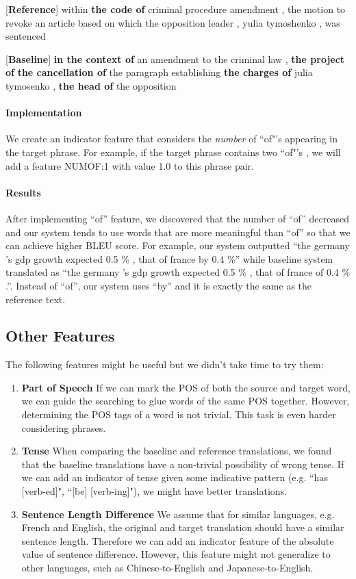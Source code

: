 \documentclass{article}
\begin{document}
[\textbf{Reference}] within \textbf{the code of} criminal procedure amendment , the motion to revoke an article based on which the opposition leader , yulia tymoshenko , was sentenced

[\textbf{Baseline}] \textbf{in the context of} an amendment to the criminal law , \textbf{the project of} \textbf{the cancellation of} the paragraph establishing \textbf{the charges of} julia tymosenko , \textbf{the head of} the opposition

\paragraph{Implementation} We create an indicator feature that considers the \textit{number} of ``of"'s appearing in the target phrase. For example, if the target phrase contains two ``of"'s , we will add a feature \textsc{NUMOF:1} with value 1.0 to this phrase pair.

\paragraph{Results} After implementing ``of'' feature, we discovered that the number of ``of'' decreased and our system tends to use words that are more meaningful than ``of'' so that we can achieve higher BLEU score. For example, our system outputted ``the germany 's gdp growth expected 0.5 \% , that of france by 0.4 \%'' while baseline system translated as ``the germany 's gdp growth expected 0.5 \% , that of france of 0.4 \% .''. Instead of ``of'', our system uses ``by'' and it is exactly the same as the reference text.

\subsection{Other Features}

The following features might be useful but we didn't take time to try them:

\begin{enumerate}
\item \textbf{Part of Speech} If we can mark the POS of both the source and target word, we can guide the searching to glue words of the same POS together. However, determining the POS tags of a word is not trivial. This task is even harder considering phrases.
\item \textbf{Tense} When comparing the baseline and reference translations, we found that the baseline translations have a non-trivial possibility of wrong tense. If we can add an indicator of tense given some indicative pattern (e.g. ``has [verb-ed]", ``[be] [verb-ing]"), we might have better translations.
\item \textbf{Sentence Length Difference} We assume that for similar languages, e.g. French and English, the original and target translation should have a similar sentence length. Therefore we can add an indicator feature of the absolute value of sentence difference. However, this feature might not generalize to other languages, such as Chinese-to-English and Japanese-to-English.
\end{enumerate}
\end{document}
